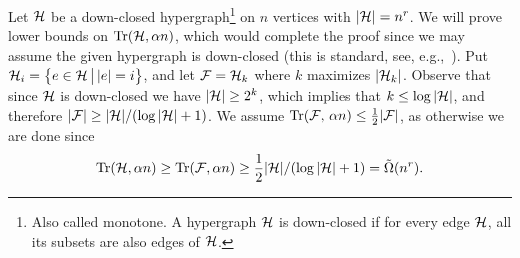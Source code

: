 \documentclass[11pt]{article}
\makeatletter
\renewenvironment{proof}[1][\proofname]
{\par\pushQED{\qed}
	\normalfont\topsep6\p@\@plus6\p@\relax\trivlist
	\item[\hskip\labelsep\bfseries#1\@addpunct{.}]
	\ignorespaces}
{\popQED\endtrivlist\@endpefalse}
\newcommand{\FF}{{\cal F}}
\renewcommand{\a}{\alpha}
\newcommand{\HH}{{\cal H}}
\DeclareMathOperator{\trace}{Tr}
\makeatother
\begin{document}
\begin{proof}
	Let $\HH$ be a down-closed hypergraph\footnote{Also called monotone. A hypergraph $\HH$ is down-closed if for every edge $\HH$, all its subsets are also edges of $\HH$.} on $n$ vertices with $|\HH|=n^r$.
	We will prove lower bounds on $\trace(\HH,\a n)$, which would complete the proof since we may assume the given hypergraph is down-closed (this is standard, see, e.g.,~\cite{Al}).
	Put $\HH_i = \big\{e \in \HH \,\big\vert\, |e|=i\big\}$, and let $\FF=\HH_k$ where $k$ maximizes $|\HH_k|$.
	Observe that since $\HH$ is down-closed we have $|\HH| \ge 2^k$, which implies that $k \le \log|\HH|$, and therefore $|\FF| \ge |\HH|/(\log|\HH|+1)$.
	We assume $\trace(\FF,\,\a n) \le \frac12|\FF|$, as otherwise we are done since
	$$\trace(\HH,\a n) \ge \trace(\FF,\a n) \ge \frac12|\HH|/(\log|\HH|+1) = \tilde{\Omega}(n^r).$$ 
	

\end{proof}
\end{document}
